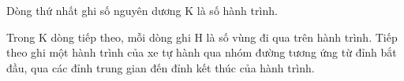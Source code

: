 Dòng thứ nhất ghi số nguyên dương K là số hành trình.  

   Trong K dòng tiếp theo, mỗi dòng ghi H là số vùng đi qua trên hành trình. Tiếp theo ghi một hành trình của xe tự hành qua nhóm đường tương ứng từ đỉnh bắt đầu, qua các đỉnh trung gian đến đỉnh kết thúc của hành trình.  

\